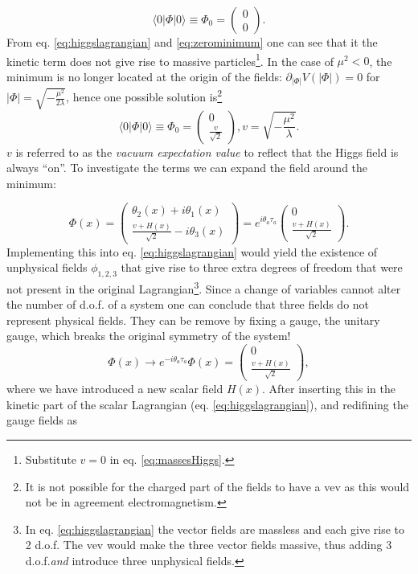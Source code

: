 \begin{equation}
\label{eq:zerominimum}
\langle 0|\Phi|0\rangle \equiv \Phi_0 = \begin{pmatrix} 0 \\ 0 \end{pmatrix}.
\end{equation} 
From eq. \ref{eq:higgslagrangian} and \ref{eq:zerominimum} one can see that it the kinetic term does not give rise to massive particles\footnote{Substitute $v=0$ in eq. \ref{eq:massesHiggs}.}. In the case of $\mu^2 < 0$, the minimum is no longer located at the origin of the fields: $\partial_{|\Phi|} V(|\Phi|) = 0$ for $|\Phi| = \sqrt{-\frac{\mu^2}{2\lambda}}$, hence one possible solution is\footnote{It is not possible for the charged part of the fields to have a vev as this would not be in agreement electromagnetism.}
\begin{equation}
\langle 0|\Phi|0\rangle \equiv \Phi_0 = \begin{pmatrix} 0 \\ \frac{v}{\sqrt{2}} \end{pmatrix}, v = \sqrt{-\frac{\mu^2}{\lambda}}.
\end{equation} 
$v$ is referred to as the \textit{vacuum expectation value} to reflect that the Higgs field is always ``on''. To investigate the terms we can expand the field around the minimum:

\begin{equation}
\Phi(x) = \begin{pmatrix} \theta_2(x) + i\theta_1(x) \\ \frac{v+H(x)}{\sqrt{2}} - i\theta_3(x) \end{pmatrix} = e^{i\theta_a\tau_a}\begin{pmatrix} 0 \\ \frac{v+H(x)}{\sqrt{2}} \end{pmatrix}.
\end{equation}
Implementing this into eq. \ref{eq:higgslagrangian} would yield the existence of unphysical fields $\phi_{1,2,3}$ that give rise to three extra degrees of freedom that were not present in the original Lagrangian\footnote{In eq. \ref{eq:higgslagrangian} the vector fields are massless and each give rise to 2 d.o.f. The vev would make the three vector fields massive, thus adding 3 d.o.f.\textit{and} introduce three unphysical fields.}. Since a change of variables cannot alter the number of d.o.f. of a system one can conclude that three fields do not represent physical fields. They can be remove by fixing a gauge, the unitary gauge, which breaks the original symmetry of the system!
\begin{equation}
\label{eq:vev}
\Phi(x) \rightarrow e^{-i\theta_a\tau_a}\Phi(x) = \begin{pmatrix} 0 \\ \frac{v+H(x)}{\sqrt{2}} \end{pmatrix},
\end{equation}
where we have introduced a new scalar field $H(x)$. After inserting this in the kinetic part of the scalar Lagrangian (eq. \ref{eq:higgslagrangian}), and redifining the gauge fields as

